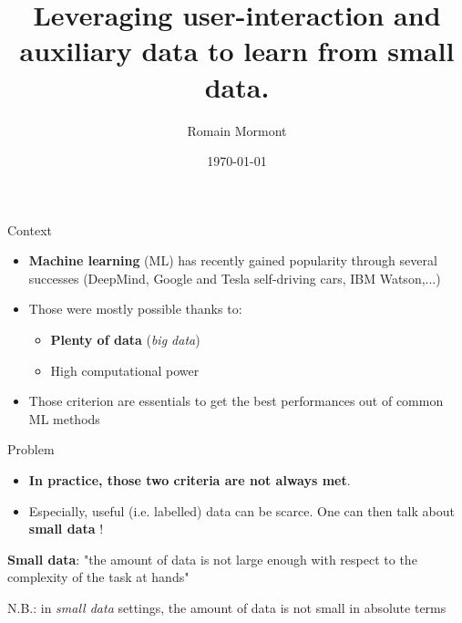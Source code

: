 \documentclass{beamer}
\title{{\bf Leveraging user-interaction and auxiliary data to learn from small data.}}
\author{Romain Mormont}
\institute{Systems and modeling unit, \\
Department of EE \& CS, \\ University of Liège, Belgium}
\date{\today}
\begin{document}
\renewcommand{\inserttotalframenumber}{12}


\begin{frame}
\titlepage
\end{frame}


\begin{frame}{Context}
	\begin{itemize}
		\item \textbf{Machine learning} (ML) has recently gained popularity through several successes (DeepMind, Google and Tesla self-driving cars, IBM Watson,...)
		\item Those were mostly possible thanks to: 
		\begin{itemize}
			\item \textbf{Plenty of data} (\textit{big data})
			\item High computational power
		\end{itemize}
		\item Those criterion are essentials to get the best performances out of common ML methods
	\end{itemize}
\end{frame}

\begin{frame}{Problem}
	\begin{itemize}
		\item \textbf{In practice, those two criteria are not always met}.
		\item Especially, useful (i.e. labelled) data can be scarce. One can then talk about \textbf{small data} ! 
	\end{itemize}
	\vfill
	\begin{center}
		\large
		\textbf{Small data}: "the amount of data is not large enough with respect to the complexity of the task at hands" 
	\end{center}
	\vfill
	\begin{center}
		\small
		N.B.: in \textit{small data} settings, the amount of data is not small in absolute terms 
	\end{center}
\end{frame}
\end{document}
